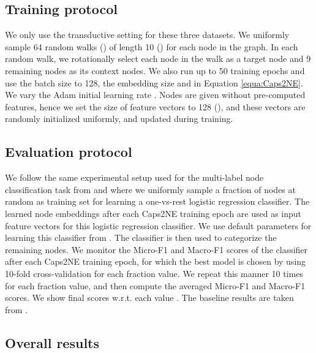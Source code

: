 \documentclass[sigconf]{acmart}
\begin{document}
\subsection{Training protocol}

We only use the transductive setting for these three datasets. We uniformly sample 64 random walks () of length 10 () for each node in the graph. 
In each random walk, we rotationally select each node in the walk as a target node and 9 remaining nodes as its context nodes.
We also run up to 50 training epochs and use the batch size to 128, the embedding size  and   in Equation \ref{equa:Caps2NE}.
We vary the Adam initial learning rate . Nodes are given without pre-computed features, hence we set the  size  of feature vectors  to 128 (), and these vectors are randomly  initialized uniformly, and updated during training.

\subsection{Evaluation protocol}

We follow the same experimental setup used for the multi-label node classification task from \citet{Perozzi:2014} and \citet{duran2017learning} where we uniformly sample a fraction  of nodes at random as training set for learning a one-vs-rest logistic regression classifier. 
The learned node embeddings after each Caps2NE training epoch are used as input feature vectors  for this logistic regression classifier. We use default parameters for learning this classifier from \citet{Perozzi:2014}. 
The classifier is then used to categorize the remaining nodes.
We monitor the Micro-F1 and Macro-F1 scores of the classifier after  each Caps2NE training epoch, for which the best model is chosen by using 10-fold cross-validation for each fraction value. 
We repeat this manner 10 times for each fraction value, and then compute the averaged Micro-F1 and Macro-F1 scores. We show final scores w.r.t. each value  .
The baseline results are taken from \citet{duran2017learning}.

\subsection{Overall results}
\end{document}
